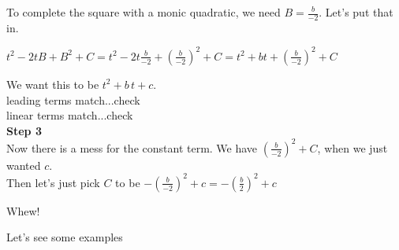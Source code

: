 \documentclass{ximera}
\begin{document}
To complete the square with a monic quadratic, we need $B = \frac{b}{-2}$.  Let's put that in.


$t^2 - 2 t B + B^2 + C = t^2 - 2 t \frac{b}{-2} + \left(\frac{b}{-2}\right)^2 + C = t^2 + b t + \left(\frac{b}{-2}\right)^2 + C$


We want this to be $t^2 + b \, t + c$. \\

leading terms match...check \\
linear terms match...check \\


\textbf{\textcolor{blue!75!black}{Step 3}} \\


Now there is a mess for the constant term.  We have $\left(\frac{b}{-2}\right)^2 + C$, when we just wanted $c$.  \\

Then let's just pick $C$ to be $-\left(\frac{b}{-2}\right)^2 + c = -\left(\frac{b}{2}\right)^2 + c$



Whew!

Let's see some examples
\end{document}
